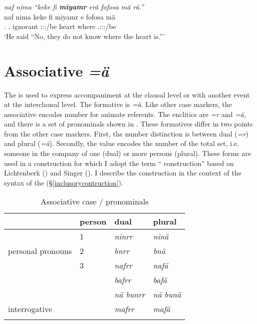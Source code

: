 \begin{exe}
	\ex \emph{naf nima ``keke fi \textbf{miyamr} erä fofosa mä rä.''}\\
	\gll naf nima keke fi miyamr e fofosa mä \\
	\Tsg.{\Erg} {\Quot} {\Neg} \Third.{\Abs} ignorant \Stpl:\Sbj:\Nonpast:\Ipfv/be heart where \Tsg.\F:\Sbj:\Nonpast:\Ipfv/be\\
	\trans `He said ``No, they do not know where the heart is.'''
	\label{ex356}
\end{exe}%

\section{Associative \emph{=ä}} \label{comcase}

The   is used to express accompaniment at the clausal level or  with another event at the interclausal level. The formative is \emph{=ä}. Like other case markers, the associative encodes number for animate referents. The enclitics are \emph{=r} and \emph{=ä}, and there is a set of pronominals shown in . These formatives differ in two points from the other case markers. First, the number distinction is between dual (\emph{=r}) and plural (\emph{=ä}). Secondly, the value encodes the number of the total set, i.e. someone in the company of one (dual) or more persons (plural). These forms are used in a construction for which I adopt the term `` construction'' based on Lichtenberk (\citeyear{Lichtenberk:2000hr}) and Singer (\citeyear{Singer:inclu}). I describe the  construction in the context of the syntax of the  ({\S}\ref{inclusorycontruction}).

\begin{table}
\caption{Associative case / pronominals}
\label{comcase-table-1}
	\begin{tabularx}{.8\textwidth}{XXXl}
		\lsptoprule
		& {person} & {dual} & {plural} \\\midrule
		\multirow{3}{3cm}{personal pronouns} &1 &\emph{ninrr} &\emph{ninä}\\
		&2 &\emph{bnrr} &\emph{bnä}\\
		&3 &\emph{nafrr} &\emph{nafä}\\
		\Recog&&\emph{bafrr}&\emph{bafä}\\
		\Indf&&\emph{nä bunrr}&\emph{nä bunä}\\
		interrogative&&\emph{mafrr}&\emph{mafä}\\
		\lspbottomrule
	\end{tabularx}
\end{table}%

